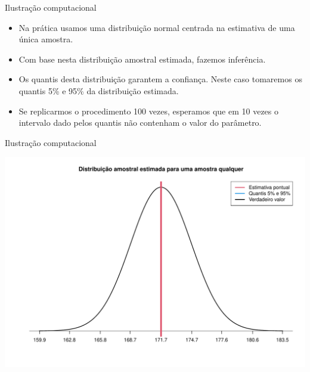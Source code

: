 \documentclass[
  ignorenonframetext,
  serif,
  professionalfont,
  usenames,
  dvipsnames,
  aspectratio = 169]{beamer}
\providecommand{\tightlist}{%
  \setlength{\itemsep}{0pt}\setlength{\parskip}{0pt}}
\renewcommand{\tightlist}{%
  \setlength{\itemsep}{0\baselineskip}
  \setlength{\parskip}{0.25\baselineskip}
}
\begin{document}
\begin{frame}{Ilustração computacional}
\protect\hypertarget{ilustrauxe7uxe3o-computacional-8}{}
\begin{itemize}
\tightlist
\item
  Na prática usamos uma distribuição normal centrada na estimativa de
  uma única amostra.
\end{itemize}

\vspace{0.3cm}

\begin{itemize}
\tightlist
\item
  Com base nesta distribuição amostral estimada, fazemos inferência.
\end{itemize}

\vspace{0.3cm}

\begin{itemize}
\tightlist
\item
  Os quantis desta distribuição garantem a confiança. Neste caso
  tomaremos os quantis 5\% e 95\% da distribuição estimada.
\end{itemize}

\vspace{0.3cm}

\begin{itemize}
\tightlist
\item
  Se replicarmos o procedimento 100 vezes, esperamos que em 10 vezes o
  intervalo dado pelos quantis não contenham o valor do parâmetro.
\end{itemize}
\end{frame}

\begin{frame}{Ilustração computacional}
\protect\hypertarget{ilustrauxe7uxe3o-computacional-9}{}
\begin{center}\includegraphics[width=0.7\linewidth]{600-intro-inferencia_files/figure-beamer/unnamed-chunk-6-1} \end{center}
\end{frame}
\end{document}
